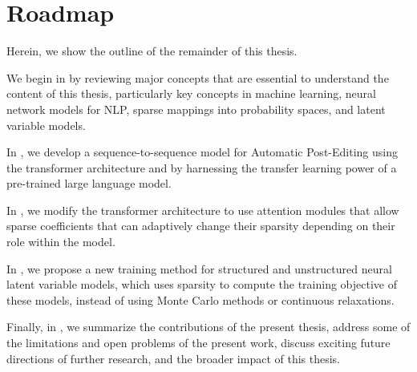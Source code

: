 \section{Roadmap}
\label{sec:int_roadmap}

\noindent Herein, we show the outline of the remainder of this thesis.

We begin in  by reviewing major concepts
that are essential to understand the content of this thesis,
particularly key concepts in machine learning, neural network models for NLP, sparse mappings
into probability spaces, and latent variable models.

In , we develop a sequence-to-sequence model for
Automatic Post-Editing using the transformer architecture and by
harnessing the transfer learning power of a pre-trained large
language model.

In , we modify the transformer architecture to use
attention modules that allow sparse coefficients that can adaptively
change their sparsity depending on their role within the model.

In , we propose a new training method for
structured and unstructured neural latent variable models, which uses
sparsity to compute the training objective of these
models, instead of using Monte Carlo methods or continuous relaxations.

Finally, in , we summarize the
contributions of the present thesis, address some of the limitations
and open problems of the present work, discuss exciting future
directions of further research, and the broader impact of this thesis.
